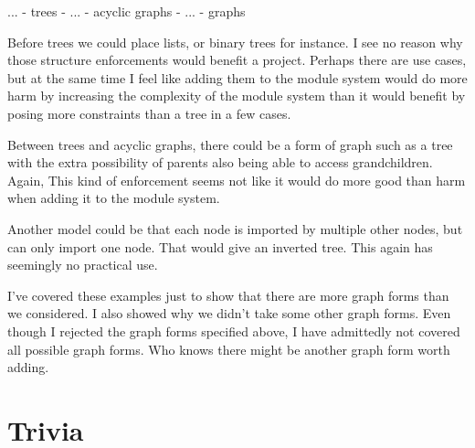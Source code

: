 \documentclass{article}
\begin{document}
... - trees - ... - acyclic graphs - ... - graphs

Before trees we could place lists, or binary trees for instance. I see no reason why those structure enforcements would benefit a project. Perhaps there are use cases, but at the same time I feel like adding them to the module system would do more harm by increasing the complexity of the module system than it would benefit by posing more constraints than a tree in a few cases.

Between trees and acyclic graphs, there could be a form of graph such as a tree with the extra possibility of parents also being able to access grandchildren. Again, This kind of enforcement seems not like it would do more good than harm when adding it to the module system.

Another model could be that each node is imported by multiple other nodes, but can only import one node. That would give an inverted tree. This again has seemingly no practical use.

I've covered these examples just to show that there are more graph forms than we considered. I also showed why we didn't take some other graph forms. Even though I rejected the graph forms specified above, I have admittedly not covered all possible graph forms. Who knows there might be another graph form worth adding.


\section{Trivia}
\end{document}
